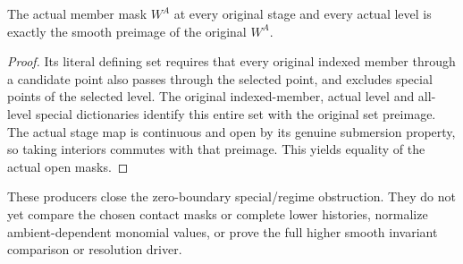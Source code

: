 \begin{theorem}
\label{hir:smooth-all-branches-original-member-mask}
\leanok
{}
The actual member mask $W^A$ at every original stage and every actual level
is exactly the smooth preimage of the original $W^A$.
\end{theorem}
\begin{proof}
Its literal defining set requires that every original indexed member
through a candidate point also passes through the selected point, and
excludes special points of the selected level.  The original indexed-member,
actual level and all-level special dictionaries identify this entire set
with the original set preimage.  The actual stage map is continuous and
open by its genuine submersion property, so taking interiors commutes with
that preimage.  This yields equality of the actual open masks.
\end{proof}

These producers close the zero-boundary special/regime obstruction.  They do
not yet compare the chosen contact masks or complete lower histories,
normalize ambient-dependent monomial values, or prove the full higher
smooth invariant comparison or resolution driver.
